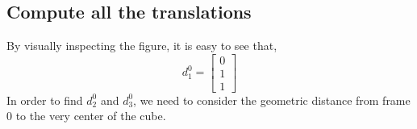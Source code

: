 \documentclass[conference]{IEEEtran}
\begin{document}
\subsection{Compute all the translations}
By visually inspecting the figure, it is easy to see that,
\[
    d^0_1 = \begin{bmatrix}
        0\\
        1\\
        1
    \end{bmatrix}
\]
In order to find $d^0_2$ and $d^0_3$, we need to consider
the geometric distance from frame 0 to the very center of the cube. 


\end{document}
